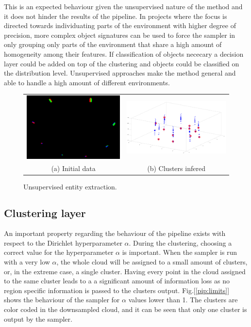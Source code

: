 \documentclass[twoside,hidelinks]{article}
\begin{document}
This is an expected behaviour given the unsupervised nature of the method and it does not hinder the results of the pipeline. In projects where the focus is directed towards individuating parts of the environment with higher degree of precision, more complex object signatures can be used to force the sampler in only grouping only parts of the environment that share a high amount of homogeneity among their features. If classification of objects nececary a decision layer could be added on top of the clustering and objects could be classified on the distribution level. Unsupervised approaches make the method general and able to handle a high amount of different environments. 


\begin{figure}[!ht]
\begin{tabular}{cc}
    \includegraphics[width=.5\textwidth]{8boxesData} &  \includegraphics[width=.5\textwidth]{8boxes} \\
  (a) Initial data  & (b) Clusters infered \\[6pt]
\end{tabular}
\caption{Unsupervised entity extraction.}
  \label{pip:beh}
\end{figure}


\subsection{Clustering layer}

An important property regarding the behaviour of the pipeline exists with respect to the Dirichlet hyperparameter $\alpha$. During the clustering, choosing a correct value for the hyperparameter $\alpha$ is important. When the sampler is run with a very low $\alpha$, the whole cloud will be assigned to a small amount of clusters, or, in the extreme case, a single cluster. Having every point in the cloud assigned to the same cluster leads to a a significant amount of information loss as no region specific information is passed to the clusters output. Fig.[\ref{pip:limits}] shows the behaviour of the sampler for $\alpha$ values lower than 1. The clusters are color coded in the downsampled cloud, and it can be seen that only one cluster is output by the sampler.
\end{document}
